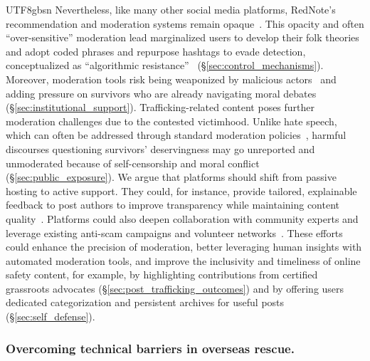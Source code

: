 \documentclass[sigconf,nonacm]{acmart}
\newcommand{\rev}[1]{#1}
\newcommand{\add}[1]{#1}
\begin{document}
\begin{CJK}{UTF8}{gbsn}
\add{Nevertheless, like many other social media platforms, RedNote's recommendation and moderation systems remain opaque~\cite{Ryan2025RedNote}. This opacity and often ``over-sensitive'' moderation lead marginalized users to develop their folk theories~\cite{mayworm2024content, wan-chi25} and adopt coded phrases and repurpose hashtags to evade detection, conceptualized as ``algorithmic resistance''~\cite{Elmimouni2025AlgorithmicResistance} (\S\ref{sec:control_mechanisms}). Moreover, moderation tools risk being weaponized by malicious actors~\cite{sabri2023challenges} and adding pressure on survivors who are already navigating moral debates (\S\ref{sec:institutional_support}). Trafficking-related content poses further moderation challenges due to the contested victimhood. Unlike hate speech, which can often be addressed through standard moderation policies~\cite{zheng-etal-2024-hatemoderate}, harmful discourses questioning survivors' deservingness may go unreported and unmoderated because of self-censorship and moral conflict (\S\ref{sec:public_exposure}). We argue that platforms should shift from passive hosting to active support. They could, for instance, provide tailored, explainable feedback to post authors to improve transparency while maintaining content quality~\cite{jiang2023trade}. Platforms could also deepen collaboration with community experts and leverage existing anti-scam campaigns and volunteer networks~\cite{gaso-website}. These efforts could enhance the precision of moderation, better leveraging human insights with automated moderation tools, and improve the inclusivity and timeliness of online safety content, for example, by highlighting contributions from certified grassroots advocates (\S\ref{sec:post_trafficking_outcomes}) and by offering users dedicated categorization and persistent archives for useful posts (\S\ref{sec:self_defense}).}

\subsubsection{\rev{Overcoming technical barriers in overseas rescue.}}


\end{CJK}
\end{document}
